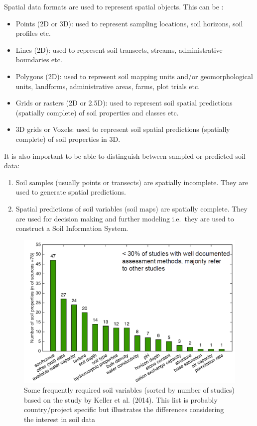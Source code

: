 \documentclass[10pt,b5paper,]{book}
\providecommand{\tightlist}{%
  \setlength{\itemsep}{0pt}\setlength{\parskip}{0pt}}
\theoremstyle{definition}
\theoremstyle{definition}
\theoremstyle{definition}
\theoremstyle{remark}
\begin{document}
Spatial data formats are used to represent spatial objects. This can be
\citep[neteler2013open]{bivand2013classes}:

\begin{itemize}
\tightlist
\item
  Points (2D or 3D): used to represent sampling locations, soil
  horizons, soil profiles etc.
\item
  Lines (2D): used to represent soil transects, streams, administrative
  boundaries etc.
\item
  Polygons (2D): used to represent soil mapping units and/or
  geomorphological units, landforms, administrative areas, farms, plot
  trials etc.
\item
  Grids or rasters (2D or 2.5D): used to represent soil spatial
  predictions (spatially complete) of soil properties and classes etc.
\item
  3D grids or Voxels: used to represent soil spatial predictions
  (spatially complete) of soil properties in 3D.
\end{itemize}

It is also important to be able to distinguish between sampled or
predicted soil data:

\begin{enumerate}
\def\labelenumi{\arabic{enumi}.}
\tightlist
\item
  Soil samples (usually points or transects) are spatially incomplete.
  They are used to generate spatial predictions.
\item
  Spatial predictions of soil variables (soil maps) are spatially
  complete. They are used for decision making and further modeling
  i.e.~they are used to construct a Soil Information System.
\end{enumerate}

\begin{figure}
\centering
\includegraphics{images/Data_sharing_soil_variables.png}
\caption{Some frequently required soil variables (sorted by number of
studies) based on the study by Keller et al. (2014). This list is
probably country/project specific but illustrates the differences
considering the interest in soil data}
\end{figure}
\end{document}

